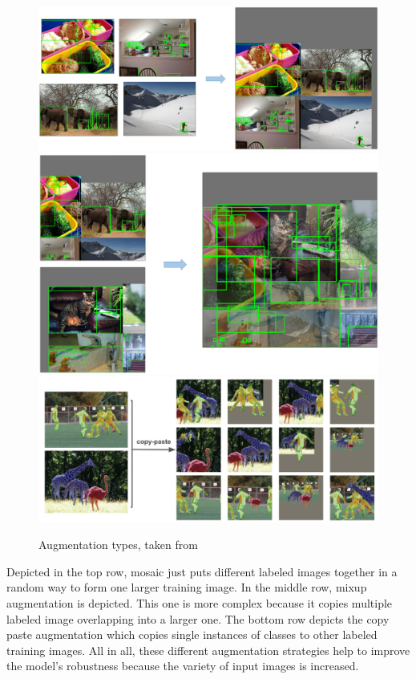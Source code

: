 \begin{figure}[h!]
	\centering
	\includegraphics[scale=0.2]{figures/mosaic.png}
	\hspace{40pt}
	\includegraphics[scale=0.2]{figures/mixup.png}
	\hspace{40pt}
	\includegraphics[scale=0.3]{figures/copy-paste.png}
	\caption{Augmentation types, taken from \cite{yolov5}}
	\label{fig:augmentation}
\end{figure}

Depicted in the top row, mosaic just puts different labeled images together in a random way to form one larger training image. In the middle row, mixup augmentation is depicted. This one is more complex because it copies multiple labeled image overlapping into a larger one. The bottom row depicts the copy paste augmentation which copies single instances of classes to other labeled training images. All in all, these different augmentation strategies help to improve the model's robustness because the variety of input images is increased. 


